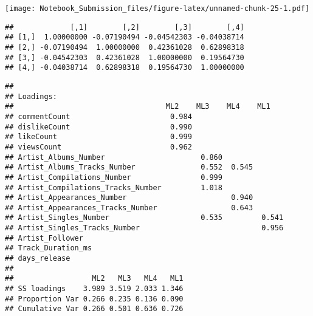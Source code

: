 \documentclass[
]{article}
\newenvironment{Shaded}{\begin{snugshade}}{\end{snugshade}}
\newcommand{\DataTypeTok}[1]{\textcolor[rgb]{0.13,0.29,0.53}{#1}}
\newcommand{\DecValTok}[1]{\textcolor[rgb]{0.00,0.00,0.81}{#1}}
\newcommand{\FloatTok}[1]{\textcolor[rgb]{0.00,0.00,0.81}{#1}}
\newcommand{\KeywordTok}[1]{\textcolor[rgb]{0.13,0.29,0.53}{\textbf{#1}}}
\newcommand{\NormalTok}[1]{#1}
\newcommand{\OperatorTok}[1]{\textcolor[rgb]{0.81,0.36,0.00}{\textbf{#1}}}
\begin{document}
\texttt{[image: Notebook\_Submission\_files/figure-latex/unnamed-chunk-25-1.pdf]}

\begin{Shaded}
\end{Shaded}

\begin{verbatim}
##             [,1]        [,2]        [,3]        [,4]
## [1,]  1.00000000 -0.07190494 -0.04542303 -0.04038714
## [2,] -0.07190494  1.00000000  0.42361028  0.62898318
## [3,] -0.04542303  0.42361028  1.00000000  0.19564730
## [4,] -0.04038714  0.62898318  0.19564730  1.00000000
\end{verbatim}

\begin{Shaded}
\end{Shaded}

\begin{verbatim}
## 
## Loadings:
##                                   ML2    ML3    ML4    ML1   
## commentCount                       0.984                     
## dislikeCount                       0.990                     
## likeCount                          0.999                     
## viewsCount                         0.962                     
## Artist_Albums_Number                      0.860              
## Artist_Albums_Tracks_Number               0.552  0.545       
## Artist_Compilations_Number                0.999              
## Artist_Compilations_Tracks_Number         1.018              
## Artist_Appearances_Number                        0.940       
## Artist_Appearances_Tracks_Number                 0.643       
## Artist_Singles_Number                     0.535         0.541
## Artist_Singles_Tracks_Number                            0.956
## Artist_Follower                                              
## Track_Duration_ms                                            
## days_release                                                 
## 
##                  ML2   ML3   ML4   ML1
## SS loadings    3.989 3.519 2.033 1.346
## Proportion Var 0.266 0.235 0.136 0.090
## Cumulative Var 0.266 0.501 0.636 0.726
\end{verbatim}
\end{document}
